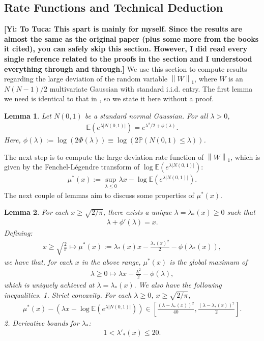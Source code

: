 \documentclass[10pt]{article}
\newcommand{\e}{\mathbb{E}}
\newcommand{\p}{\mathbb{P}}
\newcommand{\norm}[1]{\left\lVert#1\right\rVert}
\newcommand{\gy}[1]{\textbf{\color{red}[Yi: #1]}}
\newtheorem{lemma}{\bf Lemma}
\newenvironment{Proof of lemma}{\noindent{\bf Proof of Lemma}}{\hfill$\Box$\newline}
\newenvironment{Proof of claim}{\noindent{\bf Proof of claim}}{\hfill$\Box$\newline}
\newenvironment{Proof of theorem}{\noindent{\bf Proof of Theorem}}{\hfill\scriptsize{$\Box$}\newline}
\newenvironment{Proof of theorems}{\noindent{\bf Proof of Theorems}}{\hfill$\Box$\newline}
\newenvironment{Proof of proposition}{\noindent{\bf Proof of Proposition}}{\hfill$\Box$\newline}
\newenvironment{Proof of propositions}{\noindent{\bf Proof of Propositions}}{\hfill$\Box$\newline}
\newenvironment{Proof of exercise}{\noindent{\it Proof of Exercise:}}{\hfill$\Box$}
\numberwithin{equation}{section}
\begin{document}
\subsection{Rate Functions and Technical Deduction}
\gy{To Tuca: This spart is mainly for myself. Since the results are almost the same as the original paper (plus some more from the books it cited), you can safely skip this section. However, I did read every single reference related to the proofs in the section and I understood everything through and through.}
We use this section to compute results regarding the large deviation of the random variable $\norm{W}_1$, where $W$ is an $N(N-1)/2$ multivariate Gaussian with standard i.i.d. entry. The first lemma we need is identical to that in \cite{SK_optimal}, so we state it here without a proof.
\begin{lemma} \label{simple_lemma}
    Let $N(0,1)$ be a standard normal Gaussian. For all $\lambda > 0$,
    \begin{align}
        \e(e^{\lambda|N(0,1)|}) = e^{\lambda^2/2+\phi(\lambda)}.
    \end{align}
    Here, $\phi(\lambda) := \log(2\Phi(\lambda)) \equiv \log(2\p(N(0,1)\leq \lambda))$.
\end{lemma}
The next step is to compute the large deviation rate function of $\norm{W}_1$, which is given by the Fenchel-L\'egendre transform of $\log \e(e^{\lambda|N(0,1)|})$:
\begin{align}
    \mu^*(x) := \sup_{\lambda \leq 0} \lambda x - \log \e(e^{\lambda|N(0,1)|}).
\end{align}
The next couple of lemmas aim to discuss some properties of $\mu^*(x)$.
\begin{lemma} \label{calculus_lemma}
    For each $x \geq \sqrt{2/\pi}$, there exists a unique $\lambda = \lambda_*(x) \geq 0$ such that
    \begin{align}
        \lambda + \phi'(\lambda) = x.
    \end{align}
    Defining:
    \begin{align}
        x \geq \sqrt{\frac{2}{\pi}} \mapsto \mu^*(x) := \lambda_*(x)x- \frac{\lambda_*(x)^2}{2} - \phi(\lambda_*(x)),
    \end{align}
    we have that, for each $x$ in the above range, $\mu^*(x)$ is the global maximum of
    \begin{align}
        \lambda \geq 0 \mapsto \lambda x -\frac{\lambda^2}{2} - \phi(\lambda),
    \end{align}
    which is uniquely achieved at $\lambda = \lambda_*(x).$ We also have the following inequalities.
    1.  Strict concavity. For each $\lambda \geq 0$, $x \geq \sqrt{2/\pi}$,
    \begin{align} \label{mu_concavity}
        \mu^*(x) - (\lambda x - \log \e(e^{\lambda|N(0,1)|})) \in \left[\frac{(\lambda-\lambda_*(x))^2}{40},\frac{(\lambda-\lambda_*(x))^2}{2}\right].
    \end{align}
    2. Derivative bounds for $\lambda_*$:
    \begin{align}
        1 < \lambda'_*(x) \leq 20.
    \end{align}
\end{lemma}
\end{document}
